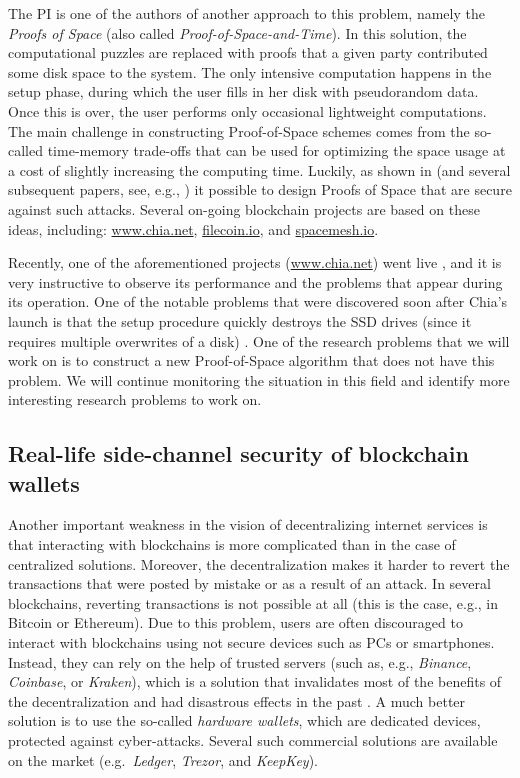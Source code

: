 \documentclass{article}
\begin{document}
The PI is one of the authors of another approach to this problem, namely the \emph{Proofs of Space} \cite{Dziembowski2015} (also called \emph{Proof-of-Space-and-Time}). In this solution, the computational puzzles are replaced with proofs that a given party contributed some disk space to the system. The only intensive computation happens in the setup phase, during which the user fills in her disk with pseudorandom data. Once this is over, the user performs only occasional lightweight computations. The main challenge in constructing Proof-of-Space schemes comes from the so-called time-memory trade-offs that can be used for optimizing the space usage at a cost of slightly increasing the computing time. Luckily, as shown in \cite{Dziembowski2015} (and several subsequent papers, see, e.g., \cite{Ren2016,Pietrzak2019,Moran2019,Abusalah2017}) it possible to design Proofs of Space that are secure against such attacks. Several on-going blockchain projects are based on these ideas, including: \url{www.chia.net}, \url{filecoin.io}, and \url{spacemesh.io}. 

Recently, one of the aforementioned projects (\url{www.chia.net}) went live \cite{Hern}, and it is very instructive to observe its performance and the problems that appear during its operation. One of the notable problems that were discovered soon after Chia's launch is that the setup procedure quickly destroys the SSD drives (since it requires multiple overwrites of a disk) \cite{Hern}. One of the research problems that we will work on is to construct a new Proof-of-Space algorithm that does not have this problem. We will continue monitoring the situation in this field and identify more interesting research problems to work on.




\subsection{Real-life side-channel security of blockchain wallets}\label{sec:side-channel}


Another important weakness in the vision of decentralizing internet services is that interacting with blockchains is more complicated than in the case of centralized solutions. Moreover, the decentralization makes it harder to revert the transactions that were posted by mistake or as a result of an attack. In several blockchains, reverting transactions is not possible at all (this is the case, e.g., in Bitcoin or Ethereum). Due to this problem, users are often discouraged to interact with block\-chains using not secure devices such as PCs or smartphones. Instead, they can rely on the help of trusted servers (such as, e.g., \emph{Binance}, \emph{Coinbase}, or \emph{Kraken}), which is a solution that invalidates most of the benefits of the decentralization and had disastrous effects in the past \cite{McMillan}. A much better solution is to use the so-called \emph{hardware wallets}, which are dedicated devices, protected against cyber-attacks. Several such commercial solutions are available on the market (e.g.~\emph{Ledger}, \emph{Trezor}, and \emph{KeepKey}). 
\end{document}
